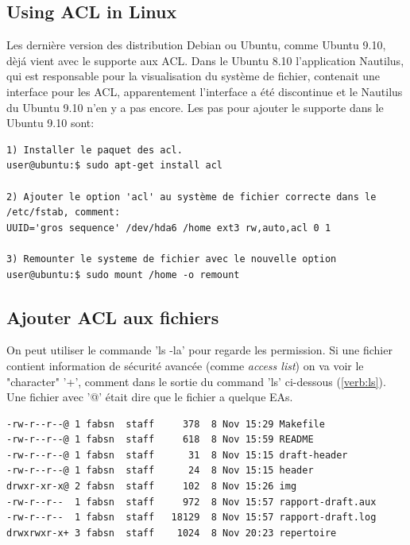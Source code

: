 

\subsection*{Using ACL in Linux}


Les dernière version des distribution Debian ou Ubuntu, comme Ubuntu 9.10, dèjá vient avec le supporte aux ACL. Dans le Ubuntu 8.10 l'application Nautilus, qui est responsable pour la visualisation du système de fichier, contenait une interface pour les ACL, apparentement l'interface a été discontinue et le Nautilus du Ubuntu 9.10 n'en y a pas encore. Les pas pour ajouter le supporte dans le Ubuntu 9.10 sont:

\begin{verbatim}
1) Installer le paquet des acl. 
user@ubuntu:$ sudo apt-get install acl
 
2) Ajouter le option 'acl' au système de fichier correcte dans le /etc/fstab, comment:
UUID='gros sequence' /dev/hda6 /home ext3 rw,auto,acl 0 1

3) Remounter le systeme de fichier avec le nouvelle option
user@ubuntu:$ sudo mount /home -o remount

\end{verbatim}

\subsection*{Ajouter ACL aux fichiers}

On peut utiliser le commande 'ls -la' pour regarde les permission. Si une fichier contient information de sécurité avancée (comme \emph{access list}) on va voir le "character" '+', comment dans le sortie du command 'ls' ci-dessous (\ref{verb:ls}). Une fichier avec '@' était dire que le fichier a quelque EAs. 

\begin{center}
\label{verb:ls}
\begin{verbatim}
-rw-r--r--@ 1 fabsn  staff     378  8 Nov 15:29 Makefile
-rw-r--r--@ 1 fabsn  staff     618  8 Nov 15:59 README
-rw-r--r--@ 1 fabsn  staff      31  8 Nov 15:15 draft-header
-rw-r--r--@ 1 fabsn  staff      24  8 Nov 15:15 header
drwxr-xr-x@ 2 fabsn  staff     102  8 Nov 15:26 img
-rw-r--r--  1 fabsn  staff     972  8 Nov 15:57 rapport-draft.aux
-rw-r--r--  1 fabsn  staff   18129  8 Nov 15:57 rapport-draft.log
drwxrwxr-x+ 3 fabsn  staff	  1024  8 Nov 20:23 repertoire
\end{verbatim}
\end{center}

